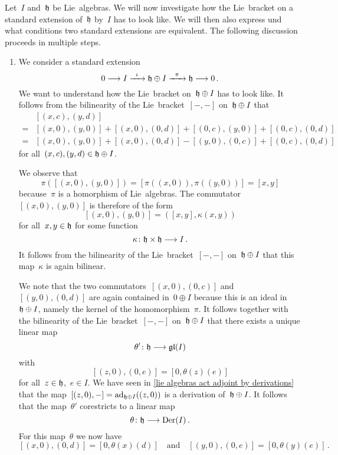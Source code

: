 \begin{fluff}
  \label{general approach to extensions}
  Let~$I$ and~$\mathfrak{h}$ be Lie~algebras.
  We will now investigate how the Lie~bracket on a standard extension of~$\mathfrak{h}$ by~$I$ has to look like.
  We will then also express und what conditions two standard extensions are equivalent.
  The following discussion proceeds in multiple steps.
  \begin{enumerate}
    \item
      We consider a standard extension
      \[
        0
        \to
        I
        \xto{\iota}
        \hlie \oplus I
        \xto{\pi}
        \hlie
        \to
        0 \,.
      \]
      We want to understand how the Lie~bracket on~$\mathfrak{h} \oplus I$ has to look like.
      It follows from the bilinearity of the Lie~bracket~$[-,-]$ on~$\mathfrak{h} \oplus I$ that
      \begin{align*}
        {}&
        [(x, c), (y,d)]
        \\
        ={}&
          [(x,0), (y,0)]
        + [(x,0), (0,d)]
        + [(0,c), (y,0)]
        + [(0,c), (0,d)]
        \\
        ={}&
          [(x,0), (y,0)]
        + [(x,0), (0,d)]
        - [(y,0), (0,c)]
        + [(0,c), (0,d)]
      \end{align*}
      for all~$(x,c), (y,d) \in \mathfrak{h} \oplus I$.

      We observe that
      \[
        \pi( [(x,0), (y,0)] )
        =
        [ \pi( (x,0) ), \pi( (y,0) ) ]
        =
        [x, y]
      \]
      because~$\pi$ is a homorphism of Lie~algebras.
      The commutator~$[(x,0), (y,0)]$ is therefore of the form
      \[
        [(x,0), (y,0)]
        =
        ( [x,y], \kappa(x,y) )
      \]
      for all~$x, y \in \mathfrak{h}$ for some function
      \[
        \kappa
        \colon
        \hlie \times \hlie
        \to
        I \,.
      \]
      It follows from the bilinearity of the Lie~bracket~$[-,-]$ on~$\mathfrak{h} \oplus I$ that this map~$\kappa$ is again bilinear.

      We note that the two commutators~$[(x,0), (0,c)]$ and~$[(y,0), (0,d)]$ are again contained in~$0 \oplus I$ because this is an ideal in~$\mathfrak{h} \oplus I$, namely the kernel of the homomorphism~$\pi$.
      It follows together with the bilinearity of the Lie~bracket~$[-,-]$ on~$\mathfrak{h} \oplus I$ that there exists a unique linear map
      \[
        \theta'
        \colon
        \hlie
        \to
        \gllie(I)
      \]
      with
      \[
        [(z,0), (0,e)]
        =
        [0, \theta(z)(e)]
      \]
      for all~$z \in \mathfrak{h}$,~$e \in I$.
      We have seen in \cref{lie algebras act adjoint by derivations} that the map~$[(z,0), -] = \operatorname{ad}_{\mathfrak{h} \oplus I}((z,0))$ is a derivation of~$\mathfrak{h} \oplus I$.
      It follows that the map~$\theta'$ corestricts to a linear map
      \[
        \theta
        \colon
        \hlie
        \to
        \Der(I) \,.
      \]
      For this map~$\theta$ we now have
      \[
        [(x,0), (0,d)]
        =
        [0, \theta(x)(d)]
        \quad\text{and}\quad
        [(y,0), (0,e)]
        =
        [0, \theta(y)(e)] \,.
      \]


\end{enumerate}
\end{fluff}
